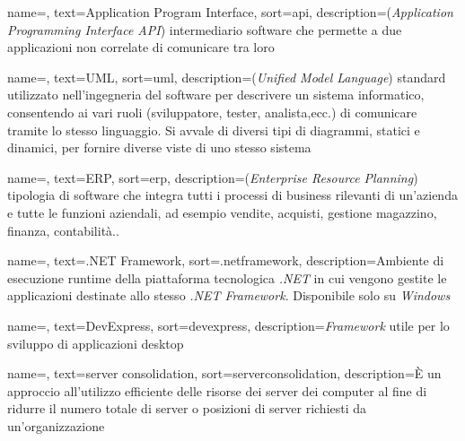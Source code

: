 
%

{
    name=,
    text=Application Program Interface,
    sort=api,
    description={(\emph{Application Programming Interface API})
    intermediario software che permette a due
    applicazioni non correlate di comunicare tra loro}
}

{
    name=,
    text=UML,
    sort=uml,
    description={(\emph{Unified Model Language})
    standard utilizzato nell'ingegneria del software
    per descrivere un sistema informatico, consentendo ai
    vari ruoli (sviluppatore, tester, analista,ecc.) di
    comunicare tramite lo stesso linguaggio. Si avvale di
    diversi tipi di diagrammi, statici e dinamici,
    per fornire diverse viste di uno stesso sistema}
}

{
    name=,
    text=ERP,
    sort=erp,
    description={(\emph{Enterprise Resource Planning})
    tipologia di software che integra tutti i processi
    di business rilevanti di un'azienda e tutte le funzioni
    aziendali, ad esempio vendite, acquisti, gestione magazzino,
    finanza, contabilità..}
}

{
    name=,
    text=.NET Framework,
    sort=.netframework,
    description={Ambiente di esecuzione runtime
    della piattaforma tecnologica \textit{.NET} in cui
    vengono gestite le applicazioni destinate allo stesso
    \textit{.NET Framework}.
    Disponibile solo su \textit{Windows}}
}

{
    name=,
    text=DevExpress,
    sort=devexpress,
    description={\textit{Framework} utile per lo sviluppo
    di applicazioni desktop}
}

{
    name=,
    text=server consolidation,
    sort=serverconsolidation,
    description={È un approccio all'utilizzo efficiente
    delle risorse dei server dei computer al fine di
    ridurre il numero totale di server o posizioni di
    server richiesti da un'organizzazione}
}


